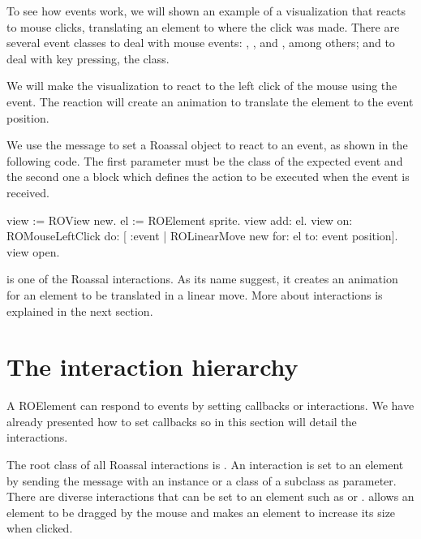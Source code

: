 \documentclass[a4paper,10pt,twoside]{book}
\begin{document}
To see how events work, we will shown an example of a visualization that reacts to mouse clicks, translating an element to where the click was made. 
There are several event classes to deal with mouse events: , ,  and , among others; and to deal with key pressing, the  class.

We will make the visualization to react to the left click of the mouse using the  event. The reaction will create an animation to translate the element to the event position.

We use the  message to set a Roassal object to react to an event, as shown in the following code. The first parameter must be the class of the expected event and the second one a block which defines the action to be executed when the event is received.

\begin{code}{}
view := ROView new.
el := ROElement sprite.
view add: el.
view 
	on: ROMouseLeftClick 
	do: [ :event | 
	        ROLinearMove new for: el to: event position].
view open. 
\end{code}


 is one of the Roassal interactions. As its name suggest, it creates an animation for an element to be translated in a linear move. More about interactions is explained in the next section.

%


\section{The interaction hierarchy} 

A ROElement can respond to events by setting callbacks or interactions. We have already presented how to set callbacks so in this section will detail the interactions. 

The root class of all Roassal interactions is . An interaction is set to an element by sending the  message with an instance or a class of a subclass  as parameter. There are diverse interactions that can be set to an element such as    or .
 allows an element to be dragged by the mouse and  makes an element to increase its size when clicked. 
\end{document}
